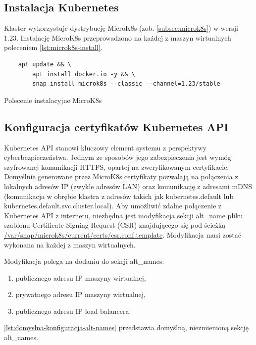\subsection{Instalacja Kubernetes}

Klaster wykorzystuje dystrybucję MicroK8s (zob. \autoref{subsec:microk8s}) w wersji 1.23.
Instalację MicroK8s przeprowadzono na każdej z maszyn wirtualnych poleceniem \autoref{lst:microk8s-install}.

\begin{listing}[H]
    \begin{verbatim}
    apt update && \
        apt install docker.io -y && \
        snap install microk8s --classic --channel=1.23/stable
    \end{verbatim}
    \caption{Polecenie instalacyjne MicroK8s}
    \label{lst:microk8s-install}
\end{listing}

\subsection{Konfiguracja certyfikatów Kubernetes API}

Kubernetes API stanowi kluczowy element systemu z perspektywy cyberbezpieczeństwa.
Jednym ze sposobów jego zabezpieczenia jest wymóg szyfrowanej komunikacji HTTPS, opartej na zweryfikowanym certyfikacie.
Domyślnie generowane przez MicroK8s certyfikaty pozwalają na połączenia z lokalnych adresów IP (zwykle adresów LAN) oraz komunikację z adresami mDNS (komunikacja w obrębie klastra z adresów takich jak kubernetes.default lub kubernetes.default.svc.cluster.local).
Aby umożliwić zdalne połączenie z Kubernetes API z internetu, niezbędna jest modyfikacja sekcji alt\_name pliku szablonu Certificate Signing Request (CSR) znajdującego się pod ścieżką \url{/var/snap/microk8s/current/certs/csr.conf.template}.
Modyfikacja musi zostać wykonana na każdej z maszyn wirtualnych.

\noindent Modyfikacja polega na dodaniu do sekcji alt\_names:
\begin{enumerate}
    \item publicznego adresu IP maszyny wirtualnej,
    \item prywatnego adresu IP maszyny wirtualnej,
    \item publicznego adresu IP load balancera.
\end{enumerate}

\noindent\autoref{lst:domyslna-konfiguracja-alt-names} przedstawia domyślną, niezmienioną sekcję alt\_names.

